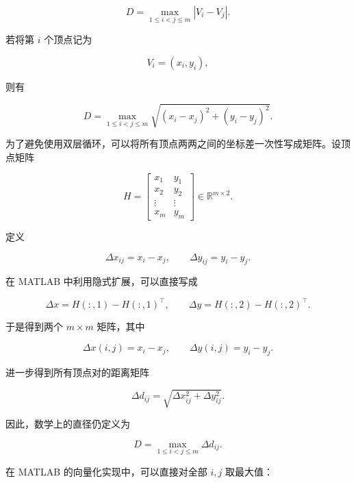 \begin{equation}
D =
\max_{1\leq i<j\leq m}
|V_i-V_j|.
\end{equation}

若将第 $i$ 个顶点记为

$$
V_i=(x_i,y_i),
$$

则有

\begin{equation}
D =
\max_{1\leq i<j\leq m}
\sqrt{
(x_i-x_j)^2+(y_i-y_j)^2
}.
\end{equation}

为了避免使用双层循环，可以将所有顶点两两之间的坐标差一次性写成矩阵。设顶点矩阵

\begin{equation}
H=
\begin{bmatrix}
x_1 & y_1\\
x_2 & y_2\\
\vdots & \vdots\\
x_m & y_m
\end{bmatrix}
\in\mathbb R^{m\times2}.
\end{equation}

定义

\begin{equation}
\Delta x_{ij}=x_i-x_j,
\qquad
\Delta y_{ij}=y_i-y_j.
\end{equation}

在 MATLAB 中利用隐式扩展，可以直接写成

\begin{equation}
\Delta x = H(:,1)-H(:,1)^{\top},
\qquad
\Delta y = H(:,2)-H(:,2)^{\top}.
\end{equation}

于是得到两个 $m\times m$ 矩阵，其中

\begin{equation}
\Delta x(i,j)=x_i-x_j,
\qquad
\Delta y(i,j)=y_i-y_j.
\end{equation}

进一步得到所有顶点对的距离矩阵

\begin{equation}
\Delta d_{ij} =
\sqrt{
\Delta x_{ij}^{2}
+
\Delta y_{ij}^{2}
}.
\end{equation}

因此，数学上的直径仍定义为

\begin{equation}
D =
\max_{1\leq i<j\leq m}\Delta d_{ij}.
\end{equation}

在 MATLAB 的向量化实现中，可以直接对全部 $i,j$ 取最大值：

